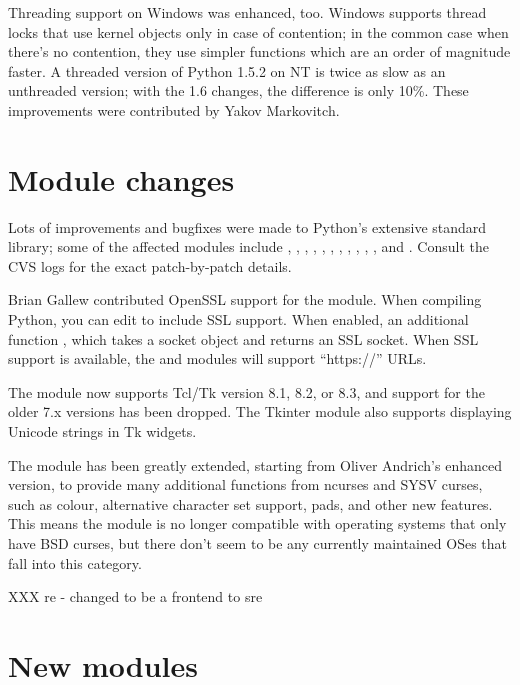 \documentclass{howto}
\begin{document}
{{Threading support on Windows was enhanced, too.  Windows supports
thread locks that use kernel objects only in case of contention; in
the common case when there's no contention, they use simpler functions
which are an order of magnitude faster.  A threaded version of Python
1.5.2 on NT is twice as slow as an unthreaded version; with the 1.6
changes, the difference is only 10\%.  These improvements were
contributed by Yakov Markovitch.

\section{Module changes}

Lots of improvements and bugfixes were made to Python's extensive
standard library; some of the affected modules include
, , ,
, , , ,
, , , ,
and .  Consult the CVS logs for the exact
patch-by-patch details.  

Brian Gallew contributed OpenSSL support for the 
module.  When compiling Python, you can edit  to
include SSL support.  When enabled, an additional function
,
which takes a socket object and returns an SSL socket.  When SSL
support is available, the  and  modules
will support ``https://'' URLs.

The  module now supports Tcl/Tk version 8.1, 8.2, or
8.3, and support for the older 7.x versions has been dropped.  The
Tkinter module also supports displaying Unicode strings in Tk
widgets.  

The  module has been greatly extended, starting from
Oliver Andrich's enhanced version, to provide many additional
functions from ncurses and SYSV curses, such as colour, alternative
character set support, pads, and other new features.  This means the
module is no longer compatible with operating systems that only have
BSD curses, but there don't seem to be any currently maintained OSes
that fall into this category.

XXX re - changed to be a frontend to sre

\section{New modules}

}}
\end{document}
